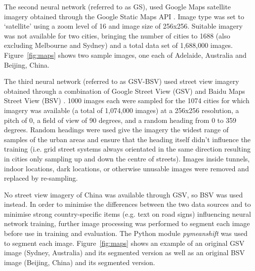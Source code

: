 \documentclass[Crown,sageh,times]{sagej}
\begin{document}
The second neural network (referred to as GS), used Google Maps satellite imagery obtained through the Google Static Maps API \citep{GoogleStatic2017}. Image type was set to `satellite' using a zoom level of 16 and image size of 256x256. Suitable imagery was not available for two cities, bringing the number of cities to 1688 (also excluding Melbourne and Sydney) and a total data set of 1,688,000 images. Figure~\ref{fig:maps} shows two sample images, one each of Adelaide, Australia and Beijing, China. 






The third neural network (referred to as GSV-BSV) used street view imagery obtained through a combination of Google Street View (GSV) \citep{GoogleMaps2017b} and Baidu Maps Street View (BSV) \citep{Baidu2017}. 1000 images each were sampled for the 1074 cities for which imagery was available (a total of 1,074,000 images) at a 256x256 resolution, a pitch of 0, a field of view of 90 degrees, and a random heading from 0 to 359 degrees. Random headings were used give the imagery the widest range of samples of the urban areas and ensure that the heading itself didn't influence the training (i.e. grid street systems always orientated in the same direction resulting in cities only sampling up and down the centre of streets). Images inside tunnels, indoor locations, dark locations, or otherwise unusable images were removed and replaced by re-sampling.

No street view imagery of China was available through GSV, so BSV was used instead.  In order to minimise the differences between the two data sources and to minimise strong country-specific items (e.g. text on road signs) influencing neural network training, further image processing was performed to segment each image before use in training and evaluation. The Python module \textit{pymeanshift} \citep{Pymeanshift2017} was used to segment each image. Figure~\ref{fig:maps} shows an example of an original GSV image (Sydney, Australia) and its segmented version as well as an original BSV image (Beijing, China) and its segmented version.
\end{document}

